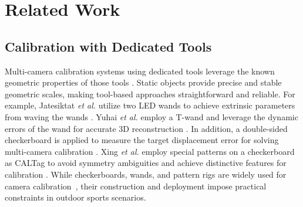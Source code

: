 \documentclass[a4paper, 10pt, conference]{ieeeconf}      %
\begin{document}
\section{Related Work}


\subsection{Calibration with Dedicated Tools} \label{sec:related_work_tools}
Multi-camera calibration systems using dedicated tools leverage the known geometric properties of those tools \cite{bolsee2020device, wu2022survey, gossard2024ewand,kanai2023robust,kedilioglu2025pricosa,kim2018charuco,pribanic2009comparison,prible2024caliscope,rameau2022mc,tabb2019multi,tripicchio2022multi}. Static objects provide precise and stable geometric scales, making tool-based approaches straightforward and reliable. For example, Jatesiktat \textit{et al.} utilize two LED wands to achieve extrinsic parameters from waving the wands \cite{jatesiktat2024multi}. Yuhai \textit{et al.} employ a T-wand and leverage the dynamic errors of the wand for accurate 3D reconstruction \cite{yuhai2024enhanced}. In addition, a double-sided checkerboard is applied to measure the target displacement error for solving multi-camera calibration \cite{marcon2017multicamera}. Xing \textit{et al.} employ special patterns on a checkerboard as CALTag \cite{atcheson2010caltag} to avoid symmetry ambiguities and achieve distinctive features for calibration \cite{xing2017new}.
While checkerboards, wands, and pattern rigs are widely used for camera calibration~\cite{jatesiktat2024multi, strauss2014calibrating, tabb2019multi, usenko2018double, xing2017new}, their construction and deployment impose practical constraints in outdoor sports scenarios.
\end{document}
